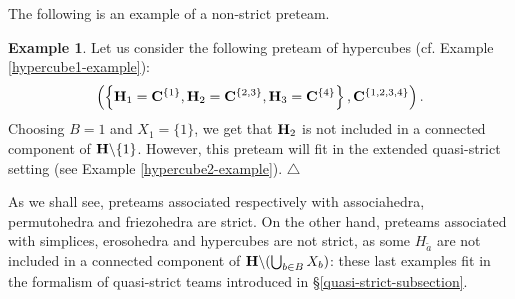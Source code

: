 \documentclass[11pt]{article}
\theoremstyle{definition}
\newtheorem{example}[theo]{Example}
\numberwithin{equation}{section}
\numberwithin{equation}{section}
\newcommand\xqed[1]{%
  \leavevmode\unskip\penalty9999 \hbox{}\nobreak\hfill
  \quad\hbox{#1}}
\newcommand\demo{\xqed{$\triangle$}}
\newcommand{\Union}{\bigcup}		%
\newcommand{\restrH}[2]{\hyper{#1}\backslash #2}
\newcommand{\hyper}[1]{{\bf #1}}
\begin{document}
The following is an example of a non-strict preteam.
 \begin{example} \label{exple:hypercubeNotStrict}
 Let us consider the following preteam of hypercubes (cf. Example \ref{hypercube1-example}):
 \begin{equation*}
 \left(\left\lbrace\hyper{H}_1= \hyper{C}^{\{1\}}, \hyper{H}_2= \hyper{C}^{\{2,3\}}, \hyper{H}_3=\hyper{C}^{\{4\}}   \right\rbrace, \hyper{C}^{\{1,2,3,4\}} \right). 
 \end{equation*}
 Choosing $B=1$ and $X_1=\{1\}$, we get that $\hyper{H}_2$ is not included in a connected component of $\restrH{H}{\{1\}}$. However, this preteam will fit in the extended quasi-strict setting (see Example \ref{hypercube2-example}).
 \demo
\end{example}
As we shall see, preteams associated respectively with associahedra, permutohedra and friezohedra are strict. 
On the other hand,  preteams associated with simplices, erosohedra and hypercubes are not strict, as some $H_{\tilde{a}}$ are not included in a connected component of    $\restrH{H}{(\Union_{b\in B}X_b)}$:
these last examples fit in the formalism of quasi-strict teams introduced in  \S\ref{quasi-strict-subsection}.  
\end{document}
